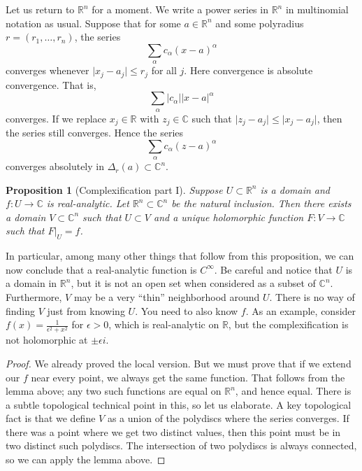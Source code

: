 \documentclass[12pt,openany]{book}
\newcommand{\sabs}[1]{\lvert {#1} \rvert}
\newcommand{\C}{{\mathbb{C}}}
\newcommand{\R}{{\mathbb{R}}}
\theoremstyle{plain}
\newtheorem{prop}[thm]{Proposition}
\theoremstyle{remark}
\theoremstyle{definition}
\theoremstyle{exercise}
\theoremstyle{example}
\begin{document}
Let us return to $\R^n$ for a moment.
We write a power series in $\R^n$ in multinomial notation as usual.
Suppose that for some
$a \in \R^n$
and some polyradius
$r=(r_1,\ldots,r_n)$,
the series
\begin{equation*}
\sum_{\alpha} c_{\alpha} {(x-a)}^\alpha
\end{equation*}
converges whenever $\sabs{x_j-a_j} \leq r_j$ for all $j$.
Here convergence is absolute convergence.  That is,
\begin{equation*}
\sum_{\alpha} \sabs{c_{\alpha}} \sabs{x-a}^\alpha
\end{equation*}
converges.
If we replace $x_j \in \R$ with $z_j \in \C$ such that
$\sabs{z_j-a_j} \leq \sabs{x_j-a_j}$, then the series still converges.
Hence the series
\begin{equation*}
\sum_{\alpha} c_{\alpha} {(z-a)}^\alpha
\end{equation*}
converges absolutely in $\Delta_r(a) \subset \C^n$.

\begin{prop}[Complexification part I]
Suppose $U \subset \R^n$ is a domain and
$f \colon U \to \C$ is real-analytic.
Let $\R^n \subset \C^n$ be the natural inclusion.
Then there exists a domain $V \subset \C^n$ such that $U \subset V$
and a unique holomorphic function $F \colon V \to \C$ such that $F|_U = f$.
\end{prop}

In particular, among many other things that follow from this proposition, we
can now conclude that a real-analytic function is $C^\infty$.  Be careful
and notice that $U$ is a domain in $\R^n$, but it is not an open set
when considered as a subset of $\C^n$.  Furthermore, $V$ may be a very
``thin'' neighborhood around $U$.  There is no way of finding $V$ just from
knowing $U$.  You need to also know $f$.
As an example, consider
$f(x) = \frac{1}{\epsilon^2+x^2}$ for $\epsilon > 0$, which is
real-analytic on $\R$, but the complexification is not holomorphic at $\pm
\epsilon i$.

\begin{proof}
We already proved the local version.  But we must prove that if we
extend our $f$ near every point, we always get the same function.
That follows from the lemma above; any two such functions are
equal on $\R^n$, and hence equal.  There is a subtle topological technical
point in this, so let us elaborate.  A key topological fact is that we define
$V$ as a union of the polydiscs where the series converges.  If there was a
point where we get two distinct values, then this point must be in two
distinct such polydiscs.  The intersection of two polydiscs is always
connected, so we can apply the lemma above.
\end{proof}
\end{document}
